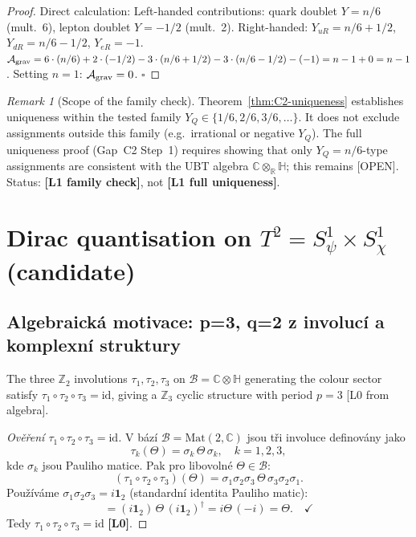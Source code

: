 \documentclass[12pt,a4paper]{article}
\theoremstyle{remark}
\newtheorem{remark}[theorem]{Remark}
\begin{document}
\begin{proof}
Direct calculation:
Left-handed contributions: quark doublet $Y=n/6$ (mult.~6),
lepton doublet $Y=-1/2$ (mult.~2).
Right-handed: $Y_{uR}=n/6+1/2$, $Y_{dR}=n/6-1/2$, $Y_{eR}=-1$.
$\mathcal{A}_{\rm grav} = 6\cdot(n/6) + 2\cdot(-1/2)
- 3\cdot(n/6+1/2) - 3\cdot(n/6-1/2) - (-1)
= n - 1 + 0 = n-1$.
Setting $n=1$: $\mathcal{A}_{\rm grav}=0$. $\square$
\end{proof}

\begin{remark}[Scope of the family check]
Theorem~\ref{thm:C2-uniqueness} establishes uniqueness within the
tested family $Y_Q \in \{1/6, 2/6, 3/6, \ldots\}$.
It does not exclude assignments outside this family
(e.g.\ irrational or negative $Y_Q$).
The full uniqueness proof (Gap~C2 Step~1) requires showing that
only $Y_Q = n/6$-type assignments are consistent with the UBT
algebra $\mathbb{C}\otimes_\mathbb{R}\mathbb{H}$; this remains [OPEN].
Status: \textbf{[L1 family check]}, not \textbf{[L1 full uniqueness]}.
\end{remark}

\section{Dirac quantisation on $T^2=S^1_\psi\times S^1_\chi$ (candidate)}
\subsection*{Algebraická motivace: p=3, q=2 z involucí a komplexní struktury}


\begin{lemma}[p=3 from SU(3) involutions]
The three $\mathbb{Z}_2$ involutions $\tau_1, \tau_2, \tau_3$ on $\mathcal{B}=\mathbb{C}\otimes\mathbb{H}$ generating the colour sector satisfy $\tau_1\circ\tau_2\circ\tau_3 = \mathrm{id}$, giving a $\mathbb{Z}_3$ cyclic structure with period $p=3$ [L0 from algebra].
\end{lemma}

\begin{proof}[Ověření $\tau_1\circ\tau_2\circ\tau_3=\mathrm{id}$]
V bází $\mathcal{B}=\mathrm{Mat}(2,\mathbb{C})$ jsou tři involuce
definovány jako
\[
\tau_k(\Theta) = \sigma_k\,\Theta\,\sigma_k,
\quad k=1,2,3,
\]
kde $\sigma_k$ jsou Pauliho matice.
Pak pro libovolné $\Theta\in\mathcal{B}$:
\[
(\tau_1\circ\tau_2\circ\tau_3)(\Theta)
= \sigma_1\sigma_2\sigma_3\,\Theta\,\sigma_3\sigma_2\sigma_1.
\]
Používáme $\sigma_1\sigma_2\sigma_3 = i\mathbf{1}_2$ (standardní identita
Pauliho matic):
\[
= (i\mathbf{1}_2)\,\Theta\,(i\mathbf{1}_2)^\dagger
= i\Theta\,(-i) = \Theta. \quad \checkmark
\]
Tedy $\tau_1\circ\tau_2\circ\tau_3=\mathrm{id}$ \textbf{[L0]}.
\end{proof}
\end{document}
